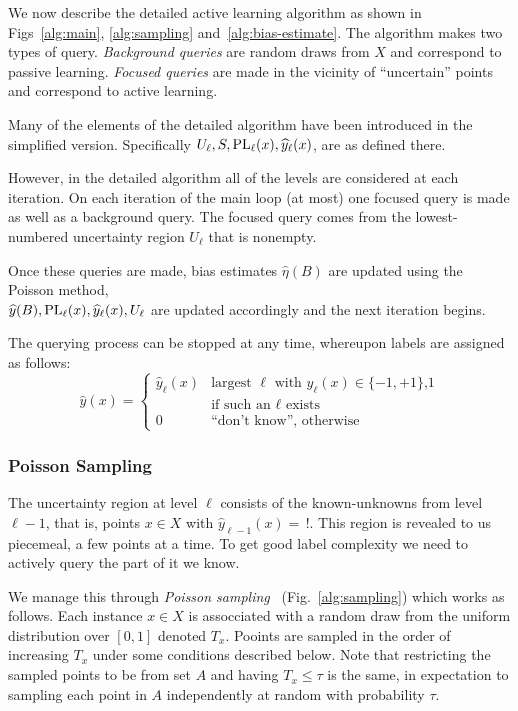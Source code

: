 \documentclass[twoside]{article}
\def\yh{{\widehat{y}}}
\def\PL{{\mbox{\rm PL}}}
\begin{document}
We now describe the detailed active learning algorithm as shown in
Figs~\ref{alg:main}, \ref{alg:sampling} and~\ref{alg:bias-estimate}.
The algorithm makes two types of query. \emph{Background queries} are random draws
from $X$ and correspond to passive learning. \emph{Focused queries}
are made in the vicinity of ``uncertain'' points and correspond to
active learning.

Many of the elements of the detailed algorithm have been introduced in the simplified version.
Specifically $U_\ell,S,\PL_\ell(x),\yh_\ell(x)$, are as defined there.

However, in the detailed algorithm all of the levels are considered at each iteration.
On each iteration of the main loop (at most) one focused
query is made as well as a background query. The focused query comes
from the lowest-numbered uncertainty region $U_\ell$ that is nonempty.

Once these queries are made, bias estimates $\widehat{\eta}(B)$ are
updated using the Poisson method,\\
$\yh(B), \PL_\ell(x), \yh_\ell(x), U_\ell$ are updated
accordingly  and the next iteration begins.

The querying process can be stopped at any time, whereupon labels are assigned as follows:
\begin{equation}
\yh(x) = 
\left\{
\begin{array}{cl}
  \yh_\ell(x) & \mbox{largest $\ell$ with $\yh_\ell(x) \in \{-1,+1\}$,1}\\
  & \mbox{if such an $\ell$ exists} \\
0 & \mbox{``don't know'', otherwise}
\end{array}
\right.
\label{eq:final-label}
\end{equation}

\subsubsection{Poisson Sampling}
\label{sec:poisson}


The uncertainty region at level $\ell$ consists of the known-unknowns
from level $\ell-1$, that is, points $x \in X$ with
$\yh_{\ell-1}(x) = \, !$. This region is revealed to us piecemeal, a
few points at a time. To get good label complexity we need to actively
query the part of it we know.

We manage this through \emph{Poisson
  sampling}~\cite{ghosh2002sampling} (Fig.~\ref{alg:sampling}) which
works as follows. Each instance $x \in X$ is assocciated with a random
draw from the uniform distribution over $[0,1]$ denoted $T_x$.
Pooints are sampled in the order of increasing $T_x$ under some
conditions described below.  Note that restricting the sampled points
to be from set $A$ and having $T_x \leq \tau$ is the same, in
expectation to sampling each point in $A$ independently at random with
probability $\tau$.
\end{document}
